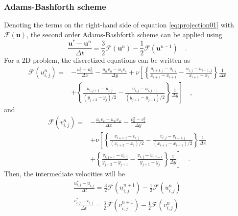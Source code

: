 \documentclass[12pt,a4paper,fleqn]{article}
\begin{document}
\subsubsection{Adams-Bashforth scheme}
Denoting the terms on the right-hand side of equation \eqref{eq:projection01} with $\mathcal{F}(\mathbf{u})$, the second order Adams-Bashforth scheme can be applied using
\begin{equation}\label{eq:adams-bashforth}
\frac{\mathbf{u}^*-\mathbf{u}^n}{\Delta t} = \frac{3}{2}\mathcal{F}(\mathbf{u}^n)-\frac{1}{2}\mathcal{F}(\mathbf{u}^{n-1})\quad .
\end{equation}
For a 2D problem, the discretized equations can be written as
\begin{align}
\mathcal{F}(u_{i,j}^n) = {}& - \frac{u_e^2 - u_w^2}{\Delta x} - \frac{u_n v_n - u_s v_s}{\Delta y} + \nu\left[
\left\{
\frac{u_{i+1,j}-u_{i,j}}{x_{i+2}-x_{i+1}}
- \frac{u_{i,j}-u_{i-1,j}}{x_{i+1}-x_i}
\right\}
\frac{1}{\Delta x}
\right.\nonumber\\
& \left. + \left\{
\frac{u_{i,j+1}-u_{i,j}}{(y_{j+2}-y_j)/2}
- \frac{u_{i,j}-u_{i,j-1}}{(y_{j+1}-y_{j-1})/2}
\right\}
\frac{1}{\Delta y}
\right] \quad ,
\label{eq:Fu}
\end{align}
and
\begin{align}
\mathcal{F}(v_{i,j}^n) = {}& - \frac{u_e v_e - u_w v_w}{\Delta x} - \frac{v_n^2 - v_s^2}{\Delta y} \nonumber\\
& + \nu\left[
\left\{
\frac{v_{i+1,j}-v_{i,j}}{(x_{i+2}-x_i)/2}
- \frac{v_{i,j}-v_{i-1,j}}{(x_{i+1}-x_{i-1})/2}
\right\}
\frac{1}{\Delta x}
\right.\nonumber\\
& \left. + \left\{
\frac{v_{i,j+1}-v_{i,j}}{y_{j+2}-y_{j+1}}
- \frac{v_{i,j}-v_{i,j-1}}{y_{j+1}-y_{j}}
\right\}
\frac{1}{\Delta y}
\right] \quad .
\label{eq:Fv}
\end{align}
Then, the intermediate velocities will be
\begin{eqnarray}
\frac{u^*_{i,j} - u^{}_{i,j}}{\Delta t} = \frac{3}{2}\mathcal{F}(u_{i,j}^{n+1}) - \frac{1}{2}\mathcal{F}(u_{i,j}^{n}) \\
\frac{v^*_{i,j} - v^{}_{i,j}}{\Delta t} = \frac{3}{2}\mathcal{F}(v_{i,j}^{n+1}) - \frac{1}{2}\mathcal{F}(v_{i,j}^{n})
\end{eqnarray}
\end{document}
